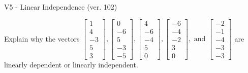 \begin{exercise}
  \begin{exerciseTitle}V5 - Linear Independence (ver. 102)\end{exerciseTitle}
  \begin{exerciseStatement}
    Explain why the vectors \(\left[\begin{array}{r}
1 \\
4 \\
-3 \\
5 \\
3
\end{array}\right] , \left[\begin{array}{r}
0 \\
-6 \\
5 \\
-3 \\
-5
\end{array}\right] , \left[\begin{array}{r}
4 \\
-6 \\
-4 \\
5 \\
0
\end{array}\right] , \left[\begin{array}{r}
-6 \\
-4 \\
-2 \\
3 \\
0
\end{array}\right] , \text{ and } \left[\begin{array}{r}
-2 \\
-1 \\
-4 \\
-3 \\
-3
\end{array}\right]\) are linearly dependent or linearly independent.	



\end{exerciseStatement}
\end{exercise}
